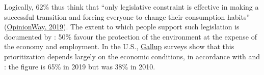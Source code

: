 \documentclass[11pt]{article}
\begin{document}
Logically, 62\% thus think that ``only legislative constraint is effective in making a successful transition and forcing everyone to change their consumption habits'' (\href{http://www.datapressepremium.com/rmdiff/2008572/Etude-OpinionWay-pour-PrimesEnergie.fr.pdf}{OpinionWay, 2019}). The extent to which people support such legislation is documented by \citet{brechon_france_2019}: 50\% favour the protection of the environment at the expense of the economy and employment. In the U.S., \href{https://news.gallup.com/poll/1615/environment.aspx}{Gallup} surveys show that this prioritization depends largely on the economic conditions, in accordance with \citet{brulle_shifting_2012} and \citet{shum_effects_2012}: the figure is 65\% in 2019 but was 38\% in 2010.






\end{document}
